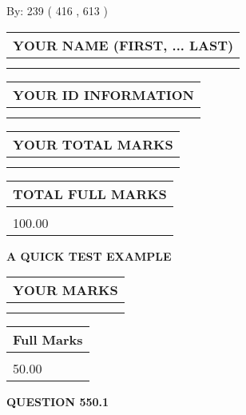 \documentclass[12pt]{article}
\begin{document}
   
\hspace{1.0in} By: 
 239 ( 416 ,  613 )
   
   
   
   
\newpage 
\setcounter{page}{ 
   550001 } 
   
   
   
   
\noindent\begin{tabular}{|l|}
\hline
YOUR NAME (FIRST, ... LAST)  \\
\hline
 \\ 
 \\ 
\hline
\end{tabular}
\hspace{0.05in} \begin{tabular}{|l|}
\hline
 YOUR   ID   INFORMATION  \\
\hline
 \\ 
 \\ 
\hline
\end{tabular}
   
   
\vspace{0.2in}\noindent\begin{tabular}{|l|}
\hline
YOUR TOTAL MARKS  \\
\hline
 \\ 
 \\ 
\hline
\end{tabular}
\hspace{0.05in} \begin{tabular}{|l|}
\hline
TOTAL FULL MARKS  \\
\hline
 \\ 
100.00 \\
\hline
\end{tabular}
   
   
 \vspace{0.2in}
{\LARGE {\textbf{ A QUICK TEST EXAMPLE}}}
   
   
  
\vspace{0.2in}
  
\noindent\begin{tabular}{|l|}
\hline
 YOUR MARKS  \\
\hline
 \\ 
 \\ 
\hline
\end{tabular}
\hspace{0.05in} \begin{tabular}{|l|}
\hline
 Full Marks  \\
\hline
 \\ 
50.00 \\
\hline
\end{tabular}
{\textbf{\Large{QUESTION
550.1 
}}}
  
\end{document}
